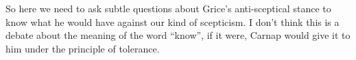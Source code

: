 \documentclass[10pt,titlepage]{book}
\newcommand{\ignore}[1]{}
\begin{document}
So here we need to ask subtle questions about Grice's anti-sceptical stance to know what he would have against our kind of scepticism.
I don't think this is a debate about the meaning of the word ``know'', if it were, Carnap would give it to him under the principle of tolerance.


\ignore{
\subection{Reductionism}

One of Grice's B\^etes Noires is reductionism, but his gripe is about a particular kind of reductive analysis, not necessarily everything which might be called reductionism.
}

\backmatter

%




\label{index}
\twocolumn[]
{\small\printindex}
\end{document}
